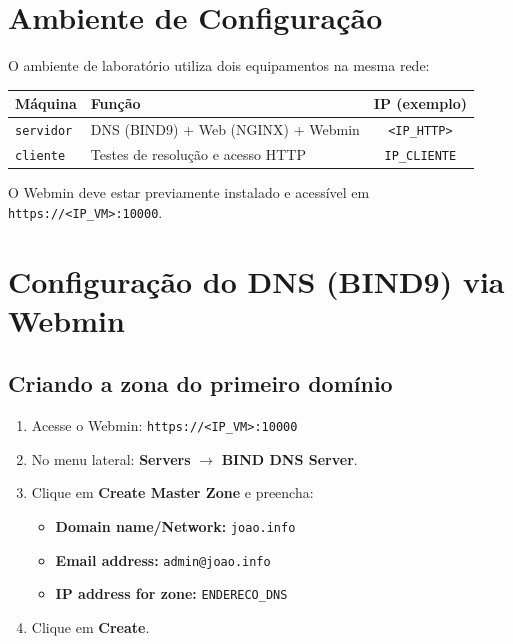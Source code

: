 \documentclass[11pt,a4paper]{article}
\begin{document}
\section{Ambiente de Configuração}

O ambiente de laboratório utiliza dois equipamentos na mesma rede:

\begin{center}
  \begin{tabular}{|l|l|c|}
    \hline
    \textbf{Máquina} & \textbf{Função} & \textbf{IP (exemplo)} \\
    \hline
    \texttt{servidor} & DNS (BIND9) + Web (NGINX) + Webmin & \texttt{<IP\_HTTP>} \\
    \texttt{cliente}  & Testes de resolução e acesso HTTP   & \texttt{IP\_CLIENTE} \\
    \hline
  \end{tabular}
\end{center}

O Webmin deve estar previamente instalado e acessível em \texttt{https://<IP\_VM>:10000}.

\section{Configuração do DNS (BIND9) via Webmin}

\subsection{Criando a zona do primeiro domínio}

\begin{enumerate}
  \item Acesse o Webmin: \texttt{https://<IP\_VM>:10000}
  \item No menu lateral: \textbf{Servers} $\rightarrow$ \textbf{BIND DNS Server}.
  \item Clique em \textbf{Create Master Zone} e preencha:
  \begin{itemize}
    \item \textbf{Domain name/Network:} \texttt{joao.info}
    \item \textbf{Email address:} \texttt{admin@joao.info}
    \item \textbf{IP address for zone:} \texttt{ENDERECO\_DNS}
  \end{itemize}
  \item Clique em \textbf{Create}.
\end{enumerate}
\end{document}

